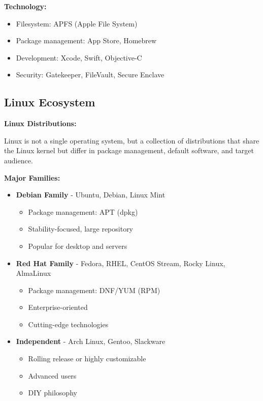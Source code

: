 \textbf{Technology:}
\begin{itemize}
    \item Filesystem: APFS (Apple File System)
    \item Package management: App Store, Homebrew
    \item Development: Xcode, Swift, Objective-C
    \item Security: Gatekeeper, FileVault, Secure Enclave
\end{itemize}

\subsection{Linux Ecosystem}

\textbf{Linux Distributions:}

Linux is not a single operating system, but a collection of distributions that share the Linux kernel but differ in package management, default software, and target audience.

\textbf{Major Families:}
\begin{itemize}
    \item \textbf{Debian Family} - Ubuntu, Debian, Linux Mint
    \begin{itemize}
        \item Package management: APT (dpkg)
        \item Stability-focused, large repository
        \item Popular for desktop and servers
    \end{itemize}

    \item \textbf{Red Hat Family} - Fedora, RHEL, CentOS Stream, Rocky Linux, AlmaLinux
    \begin{itemize}
        \item Package management: DNF/YUM (RPM)
        \item Enterprise-oriented
        \item Cutting-edge technologies
    \end{itemize}

    \item \textbf{Independent} - Arch Linux, Gentoo, Slackware
    \begin{itemize}
        \item Rolling release or highly customizable
        \item Advanced users
        \item DIY philosophy
    \end{itemize}
\end{itemize}

